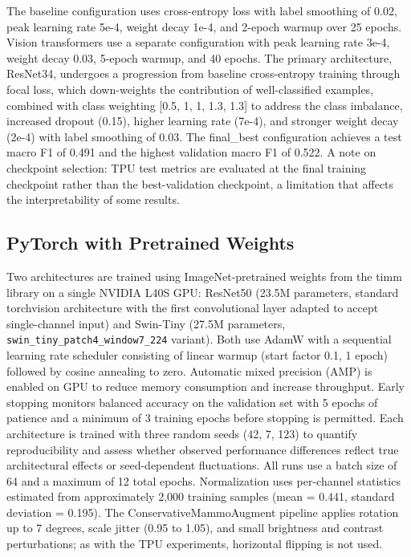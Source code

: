 \documentclass[justified,notoc,openany]{tufte-book}
\begin{document}
The baseline configuration uses cross-entropy loss with label smoothing of 0.02, peak learning rate 5e-4, weight decay 1e-4, and 2-epoch warmup over 25 epochs. Vision transformers use a separate configuration with peak learning rate 3e-4, weight decay 0.03, 5-epoch warmup, and 40 epochs. The primary architecture, ResNet34, undergoes a progression from baseline cross-entropy training through focal loss, which down-weights the contribution of well-classified examples, combined with class weighting {[}0.5, 1, 1, 1.3, 1.3{]} to address the class imbalance, increased dropout (0.15), higher learning rate (7e-4), and stronger weight decay (2e-4) with label smoothing of 0.03. The final\_best configuration achieves a test macro F1 of 0.491 and the highest validation macro F1 of 0.522. A note on checkpoint selection: TPU test metrics are evaluated at the final training checkpoint rather than the best-validation checkpoint, a limitation that affects the interpretability of some results.

\subsection{PyTorch with Pretrained Weights}\label{pytorch-with-pretrained-weights}

Two architectures are trained using ImageNet-pretrained weights from the timm library on a single NVIDIA L40S GPU: ResNet50 (23.5M parameters, standard torchvision architecture with the first convolutional layer adapted to accept single-channel input) and Swin-Tiny (27.5M parameters, \texttt{swin\_tiny\_patch4\_window7\_224} variant). Both use AdamW with a sequential learning rate scheduler consisting of linear warmup (start factor 0.1, 1 epoch) followed by cosine annealing to zero. Automatic mixed precision (AMP) is enabled on GPU to reduce memory consumption and increase throughput. Early stopping monitors balanced accuracy on the validation set with 5 epochs of patience and a minimum of 3 training epochs before stopping is permitted. Each architecture is trained with three random seeds (42, 7, 123) to quantify reproducibility and assess whether observed performance differences reflect true architectural effects or seed-dependent fluctuations. All runs use a batch size of 64 and a maximum of 12 total epochs. Normalization uses per-channel statistics estimated from approximately 2,000 training samples (mean = 0.441, standard deviation = 0.195). The ConservativeMammoAugment pipeline applies rotation up to 7 degrees, scale jitter (0.95 to 1.05), and small brightness and contrast perturbations; as with the TPU experiments, horizontal flipping is not used.
\end{document}
